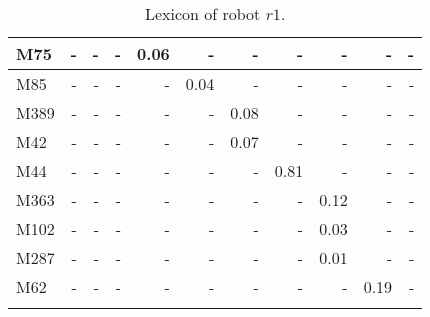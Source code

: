 \begin{table}[h]
{\begin{tabular}{ld{3}d{3}d{3}d{3}d{3}d{3}d{3}d{3}d{3}d{3}}
M75 & - & - & - & 0.06 & - & - & - & - & - & -\\\hline
M85 & - & - & - & - & 0.04 & - & - & - & - & -\\\hline
M389 & - & - & - & - & - & 0.08 & - & - & - & -\\\hline
M42 & - & - & - & - & - & 0.07 & - & - & - & -\\\hline
M44 & - & - & - & - & - & - & 0.81 & - & - & -\\\hline
M363 & - & - & - & - & - & - & - & 0.12 & - & -\\\hline
M102 & - & - & - & - & - & - & - & 0.03 & - & -\\\hline
M287 & - & - & - & - & - & - & - & 0.01 & - & -\\\hline
M62 & - & - & - & - & - & - & - & - & 0.19 & -\\
\lspbottomrule
\end{tabular}}
\caption{Lexicon of robot $r1$.}
\label{t:st:lexicon1}
\end{table}

